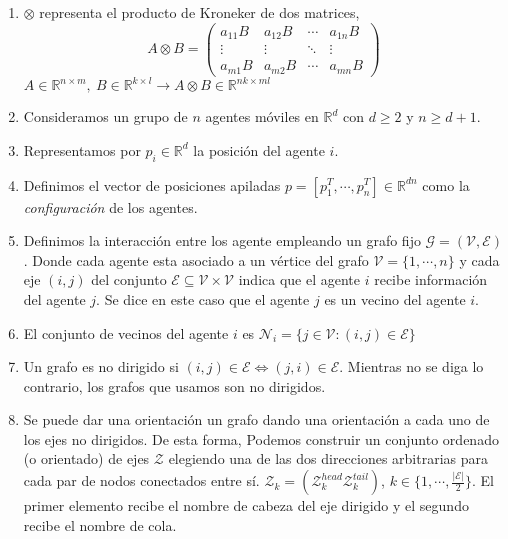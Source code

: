 \documentclass[10pt,a4paper]{article}
\begin{document}
\begin{enumerate}
\item $\otimes$ representa el producto de Kroneker de dos matrices,
\begin{equation}
A\otimes B = \begin{pmatrix}
a_{11}B & a_{12}B &\cdots& a_{1n}B\\
\vdots  &\vdots &\ddots & \vdots\\
a_{m1}B &a_{m2}B &\cdots & a_{mn}B
\end{pmatrix}
\end{equation}
$A\in \mathbb{R}^{n\times m},\ B\in \mathbb{R}^{k\times l} \rightarrow A\otimes B \in \mathbb{R}^{nk\times ml}$
\item Consideramos un grupo de $n$ agentes móviles en $\mathbb{R}^d$ con $d\geq 2$ y $n \geq d+1$.          
\item Representamos por $p_i \in \mathbb{R}^d$ la posición del agente $i$.
\item Definimos el vector de posiciones apiladas $p =[p_1^T,\cdots,p_n^T] \in \mathbb{R}^{dn}$ como la \emph{configuración} de los agentes.
\item Definimos la interacción entre los agente empleando un grafo fijo $\mathcal{G} = (\mathcal{V},\mathcal{E})$. Donde cada agente esta asociado a un vértice del grafo $\mathcal{V}= \{1,\cdots,n\}$ y cada eje $(i,j)$ del conjunto $\mathcal{E} \subseteq \mathcal{V}\times \mathcal{V}$ indica que el agente $i$ recibe información del agente $j$. Se dice en este caso que el agente $j$ es un vecino del agente $i$.
\item El conjunto de vecinos del agente $i$ es $\mathcal{N}_i = \{j \in \mathcal{V}: (i,j) \in \mathcal{E}\}$
\item Un grafo es no dirigido si $(i,j)\in \mathcal{E} \Leftrightarrow (j,i) \in \mathcal{E}$. Mientras  no se diga lo contrario, los grafos que usamos son no dirigidos.
\item Se puede dar una orientación  un grafo dando una orientación a cada uno de los ejes no dirigidos. De esta forma, Podemos construir un conjunto ordenado (o orientado) de ejes $\mathcal{Z}$ elegiendo una de las dos direcciones arbitrarias para cada par de nodos conectados entre sí. $\mathcal{Z}_k=(\mathcal{Z}_k^{head} \mathcal{Z}_k^{tail})$, $k \in \{1,\cdots,\frac{\vert\mathcal{E}\vert}{2}\}$. El primer elemento recibe el nombre de cabeza del eje dirigido y el segundo recibe el nombre de cola.


\end{enumerate}
\end{document}
